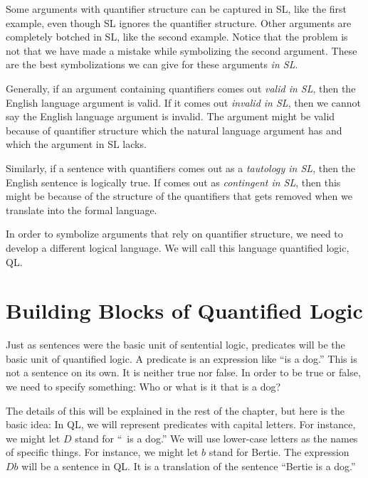 Some arguments with quantifier structure can be captured in SL, like the first example, even though SL ignores the quantifier structure. Other arguments are completely botched in SL, like the second example. Notice that the problem is not that we have made a mistake while symbolizing the second argument. These are the best symbolizations we can give for these arguments \emph{in SL}.

Generally, if an argument containing quantifiers comes out \emph{valid in SL}, then the English language argument is valid. If it comes out \emph{invalid in SL}, then we cannot say the English language argument is invalid. The argument might be valid because of quantifier structure which the natural language argument has and which the argument in SL lacks.


Similarly, if a sentence with quantifiers comes out as a \emph{tautology in SL}, then the English sentence is logically true. If comes out as \emph{contingent in SL}, then this might be because of the structure of the quantifiers that gets removed when we translate into the formal language.


In order to symbolize arguments that rely on quantifier structure, we need to develop a different logical language. We will call this language quantified logic, QL.


\section{Building Blocks of Quantified Logic}



Just as sentences were the basic unit of sentential logic, predicates will be the basic unit of quantified logic. A predicate is an expression like ``is a dog.'' This is not a sentence on its own. It is neither true nor false. In order to be true or false, we need to specify something: Who or what is it that is a dog?

The details of this will be explained in the rest of the chapter, but here is the basic idea: In QL, we will represent predicates with capital letters. For instance, we might let $D$ stand for ``\blank\ is a dog.'' We will use lower-case letters as the names of specific things. For instance, we might let $b$ stand for Bertie. The expression $Db$ will be a sentence in QL. It is a translation of the sentence ``Bertie is a dog.''

